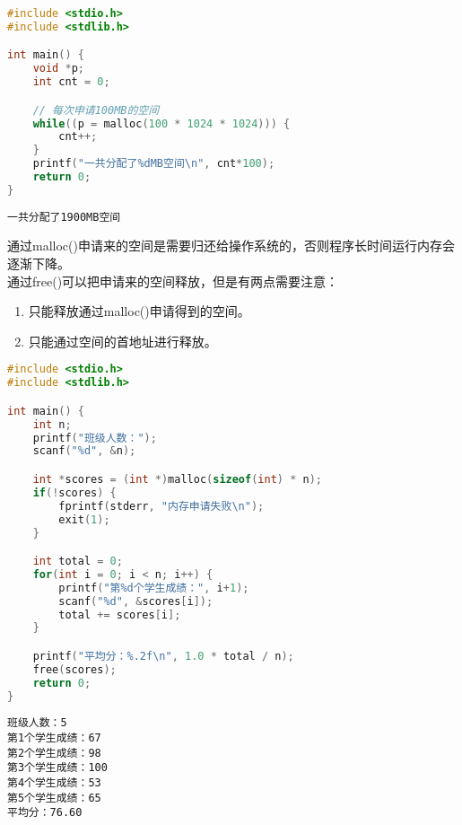 
\begin{lstlisting}[language=C]
#include <stdio.h>
#include <stdlib.h>

int main() {
    void *p;
    int cnt = 0;

    // 每次申请100MB的空间
    while((p = malloc(100 * 1024 * 1024))) {
        cnt++;
    }
    printf("一共分配了%dMB空间\n", cnt*100);
    return 0;
}
\end{lstlisting}

\begin{tcolorbox}
	\begin{verbatim}
一共分配了1900MB空间
	\end{verbatim}
\end{tcolorbox}

通过malloc()申请来的空间是需要归还给操作系统的，否则程序长时间运行内存会逐渐下降。\\

通过free()可以把申请来的空间释放，但是有两点需要注意：

\begin{enumerate}
	\item 只能释放通过malloc()申请得到的空间。
	\item 只能通过空间的首地址进行释放。
\end{enumerate}

\vspace{0.5cm}


\begin{lstlisting}[language=C]
#include <stdio.h>
#include <stdlib.h>

int main() {
    int n;
    printf("班级人数：");
    scanf("%d", &n);

    int *scores = (int *)malloc(sizeof(int) * n);
    if(!scores) {
        fprintf(stderr, "内存申请失败\n");
        exit(1);
    }

    int total = 0;
    for(int i = 0; i < n; i++) {
        printf("第%d个学生成绩：", i+1);
        scanf("%d", &scores[i]);
        total += scores[i];
    }

    printf("平均分：%.2f\n", 1.0 * total / n);
    free(scores);
    return 0;
}
\end{lstlisting}

\begin{tcolorbox}
	\begin{verbatim}
班级人数：5
第1个学生成绩：67
第2个学生成绩：98
第3个学生成绩：100
第4个学生成绩：53
第5个学生成绩：65
平均分：76.60
	\end{verbatim}
\end{tcolorbox}

